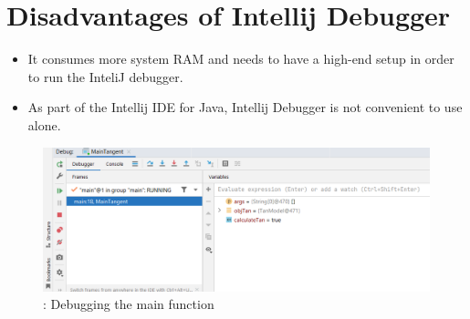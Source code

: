 \documentclass[12pt]{article}
\begin{document}
\section*{Disadvantages of Intellij Debugger}
    \begin{itemize}
        \item It consumes more system RAM and needs to have a high-end setup in order to run the InteliJ debugger.
        \item As part of the Intellij IDE for Java, Intellij Debugger is not convenient to use alone.
    \end{itemize}
    
    \begin{figure}
    \centering
            \includegraphics[width=12cm]{debug.png}
                \caption{: Debugging the main function}
        \end{figure}
\end{document}
